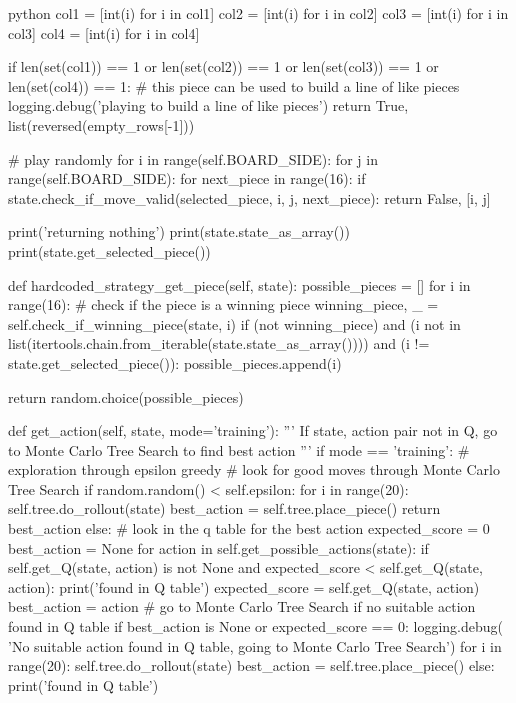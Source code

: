 \begin{mintedbox}{python}
                col1 = [int(i) for i in col1]
                col2 = [int(i) for i in col2]
                col3 = [int(i) for i in col3]
                col4 = [int(i) for i in col4]

                if len(set(col1)) == 1 or len(set(col2)) == 1 or len(set(col3)) == 1 or len(set(col4)) == 1:
                    # this piece can be used to build a line of like pieces
                    logging.debug('playing to build a line of like pieces')
                    return True, list(reversed(empty_rows[-1]))

        # play randomly
        for i in range(self.BOARD_SIDE):
            for j in range(self.BOARD_SIDE):
                for next_piece in range(16):
                    if state.check_if_move_valid(selected_piece, i, j, next_piece):
                        return False, [i, j]

        print('returning nothing')
        print(state.state_as_array())
        print(state.get_selected_piece())

    def hardcoded_strategy_get_piece(self, state):
        possible_pieces = []
        for i in range(16):
            # check if the piece is a winning piece
            winning_piece, _ = self.check_if_winning_piece(state, i)
            if (not winning_piece) and (i not in list(itertools.chain.from_iterable(state.state_as_array()))) and (i != state.get_selected_piece()):
                possible_pieces.append(i)

        return random.choice(possible_pieces)

    def get_action(self, state, mode='training'):
        '''
        If state, action pair not in Q, go to Monte Carlo Tree Search to find best action
        '''
        if mode == 'training':
            # exploration through epsilon greedy
            # look for good moves through Monte Carlo Tree Search
            if random.random() < self.epsilon:
                for i in range(20):
                    self.tree.do_rollout(state)
                best_action = self.tree.place_piece()
                return best_action
            else:
                # look in the q table for the best action
                expected_score = 0
                best_action = None
                for action in self.get_possible_actions(state):
                    if self.get_Q(state, action) is not None and expected_score < self.get_Q(state, action):
                        print('found in Q table')
                        expected_score = self.get_Q(state, action)
                        best_action = action
                # go to Monte Carlo Tree Search if no suitable action found in Q table
                if best_action is None or expected_score == 0:
                    logging.debug(
                        'No suitable action found in Q table, going to Monte Carlo Tree Search')
                    for i in range(20):
                        self.tree.do_rollout(state)
                    best_action = self.tree.place_piece()
                else:
                    print('found in Q table')


\end{mintedbox}
